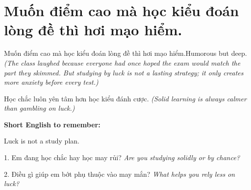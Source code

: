 \section{Muốn điểm cao mà học kiểu đoán lòng đề thì hơi mạo hiểm.}
\begin{truyen}{Muốn điểm cao mà học kiểu đoán lòng đề thì hơi mạo hiểm.}{Humorous but deep.}
\textit{(The class laughed because everyone had once hoped the exam would match the part they skimmed. But studying by luck is not a lasting strategy; it only creates more anxiety before every test.)}
\end{truyen}

\begin{baihoc}
Học chắc luôn yên tâm hơn học kiểu đánh cược.
\textit{(Solid learning is always calmer than gambling on luck.)}
\end{baihoc}

\begin{ghinhoanh}
\textbf{Short English to remember:}

Luck is not a study plan.

\end{ghinhoanh}

\begin{tuhocnhanh}
1. Em đang học chắc hay học may rủi? \textit{Are you studying solidly or by chance?}

2. Điều gì giúp em bớt phụ thuộc vào may mắn? \textit{What helps you rely less on luck?}
\end{tuhocnhanh}
\ngancach